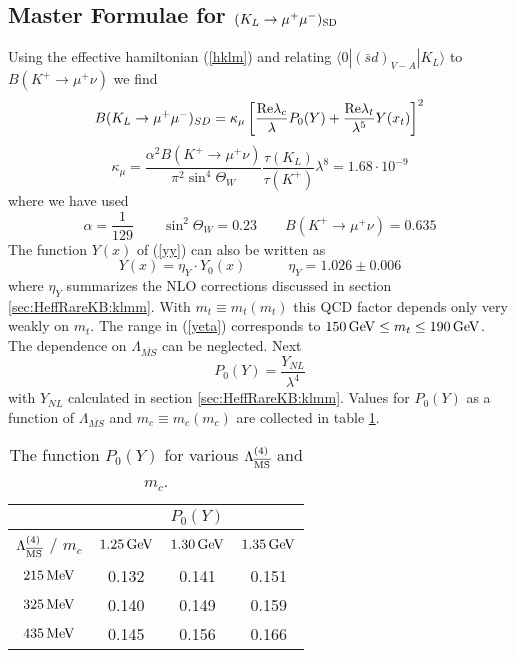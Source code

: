 \subsection{Master Formulae for $(K_L \to \mu^+ \mu^-)_{\rm SD}$}
\label{sec:KLmm:MasterKL}
Using the effective hamiltonian (\ref{hklm}) and relating
$\langle 0|(\bar sd)_{V-A}|K_L\rangle$ to $B(K^+\to\mu^+\nu)$
we find
\begin{equation}\label{bklm}
B(K_L \to \mu^+\mu^-)_{SD}=\kappa_\mu\left[\frac{{\rm Re} \lambda_c}{\lambda}P_0(Y)+
\frac{{\rm Re} \lambda_t}{\lambda^5} Y(x_t)\right]^2
\end{equation}
\begin{equation}\label{kapm}
\kappa_\mu=\frac{\alpha^2 B(K^+\to\mu^+\nu)}{\pi^2\sin^4\Theta_W}
\frac{\tau(K_L)}{\tau(K^+)}\lambda^8=1.68\cdot 10^{-9}
\end{equation}
where we have used
\begin{equation}\label{klmpar}
\alpha=\frac{1}{129}\qquad \sin^2\Theta_W=0.23\qquad
B(K^+\to\mu^+\nu)=0.635
\end{equation}
The function $Y(x)$ of (\ref{yy}) can also be written as
\begin{equation}\label{yeta}
Y(x)=\eta_Y\cdot Y_0(x) \qquad\quad \eta_Y=1.026\pm 0.006
\end{equation}
where $\eta_Y$ summarizes the NLO corrections discussed in section
\ref{sec:HeffRareKB:klmm}. With $m_t\equiv m_t(m_t)$ this QCD factor
depends only very weakly on $m_t$. The range in (\ref{yeta})
corresponds to $150\, {\rm GeV}\leq m_t\leq 190\, {\rm GeV}$. The dependence on
$\Lambda_{\overline{MS}}$ can be neglected. Next
\begin{equation}\label{p0kldef}
P_0(Y)=\frac{Y_{NL}}{\lambda^4}
\end{equation}
with $Y_{NL}$ calculated in section \ref{sec:HeffRareKB:klmm}.
Values for $P_0(Y)$ as a function of $\Lambda_{\overline{MS}}$
and $m_c\equiv m_c(m_c)$ are collected in table \ref{tab:P0KL}.

\begin{table}[htb]
\caption[]{The function $P_0(Y)$ for various $\Lambda_{\overline{\rm MS}}^{(4)}$ and $m_c$.
\label{tab:P0KL}}
\begin{center}
\begin{tabular}{|c|c|c|c|}
&\multicolumn{3}{c|}{$P_0(Y) $}\\
\hline
$\Lambda_{\overline{\rm MS}}^{(4)}$ / $m_c$  & $1.25\, {\rm GeV}$ & $1.30\, {\rm GeV}$ & $1.35\, {\rm GeV}$\\
\hline
$215\, {\rm MeV}$ & 0.132 & 0.141 & 0.151 \\
$325\, {\rm MeV}$ & 0.140 & 0.149 & 0.159 \\
$435\, {\rm MeV}$ & 0.145 & 0.156 & 0.166
\end{tabular}
\end{center}
\end{table}

